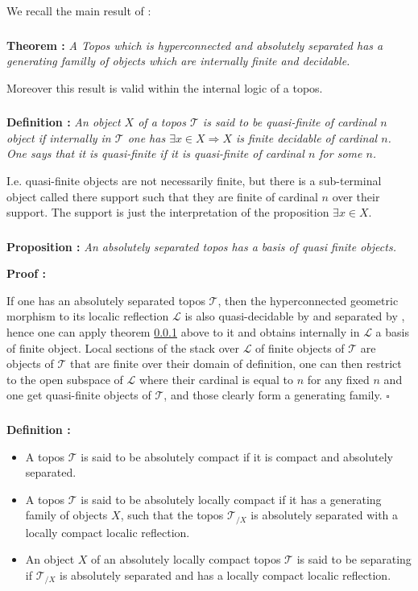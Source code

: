 \documentclass[a4paper]{article}
\newcommand{\Tcal}{\mathcal{T}}
\newcommand{\Lcal}{\mathcal{L}}
\newcommand{\block}[1]
{

\par \subsubsection{} #1

\bigskip}
\newcommand{\blockn}[1]{\par #1 \bigskip}
\newcommand{\Th}[1]
	{
	\bigskip	
	\textbf{Theorem : }{\itshape #1}
		
	\bigskip
	}
\newcommand{\Prop}[1]
	{

	\bigskip
	
	\textbf{Proposition : }{\itshape #1}
		
	\bigskip
	
	}
\newcommand{\Def}[1]
	{
	
	\bigskip
	
	\textbf{Definition : }{\itshape #1}
	
	\bigskip
	
	}
\newcommand{\Dem}[1]{
	
	\smallskip
	
	\textbf{Proof : } \par
	 {#1} $\square$
	 
	 \bigskip
}
\begin{document}
\blockn{We recall the main result of \cite{henry2015finitness}:}

\block{\label{HCfinitnessTh}\Th{A Topos which is hyperconnected and absolutely separated has a generating familly of objects which are internally finite and decidable. }

Moreover this result is valid within the internal logic of a topos.

}

\block{\Def{An object $X$ of a topos $\Tcal$ is said to be quasi-finite of cardinal $n$ object if internally in $\Tcal$ one has $\exists x \in X \Rightarrow  X$ is finite decidable of cardinal $n$.
One says that it is quasi-finite if it is quasi-finite of cardinal $n$ for some $n$.
}

I.e. quasi-finite objects are not necessarily finite, but there is a sub-terminal object called there support such that they are finite of cardinal $n$ over their support. The support is just the interpretation of the proposition $\exists x \in X$.
}

\block{\label{PropQfinExist}\Prop{An absolutely separated topos has a basis of quasi finite objects.}

\Dem{If one has an absolutely separated topos $\Tcal$, then the hyperconnected geometric morphism to its localic reflection $\Lcal$ is also quasi-decidable by \cite[5.2]{henry2015finitness} and separated by \cite[II.2.5]{moerdijk2000proper}, hence one can apply theorem \ref{HCfinitnessTh} above to it and obtains internally in $\Lcal$ a basis of finite object. Local sections of the stack over $\Lcal$ of finite objects of $\Tcal$ are objects of $\Tcal$ that are finite over their domain of definition, one can then restrict to the open subspace of $\Lcal$ where their cardinal is equal to $n$ for any fixed $n$ and one get quasi-finite objects of $\Tcal$, and those clearly form a generating family. }

}


\block{\label{def_absloccpt}\Def{\begin{itemize}
\item A topos $\Tcal$ is said to be absolutely compact if it is compact and absolutely separated.

\item A topos $\Tcal$ is said to be absolutely locally compact if it has a generating family of objects $X$, such that the topos $\Tcal_{/X}$ is absolutely separated with a locally compact localic reflection.

\item An object $X$ of an absolutely locally compact topos $\Tcal$ is said to be separating if $\Tcal_{/X}$ is absolutely separated and has a locally compact localic reflection. 

\end{itemize}
}}
\end{document}
